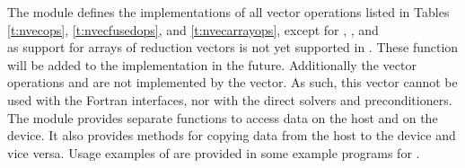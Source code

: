 
The {\nvecraja} module defines the implementations of all vector operations listed
in Tables \ref{t:nvecops}, \ref{t:nvecfusedops}, and \ref{t:nvecarrayops}, except
for , , and \\ \noindent
{} as support for arrays of reduction vectors is not
yet supported in {\raja}. These function will be added to the {\nvecraja}
implementation in the future. Additionally the vector operations  and
 are not implemented by the {\raja} vector.
As such, this vector cannot be used with the {\sundials} Fortran interfaces,
nor with the {\sundials} direct solvers and preconditioners.
The {\nvecraja} module provides separate functions to access data on the host
and on the device. It also provides methods for copying data from the host to
the device and vice versa. Usage examples of {\nvecraja} are provided in
some example programs for {\cvode} \cite{cvode_ex}.

